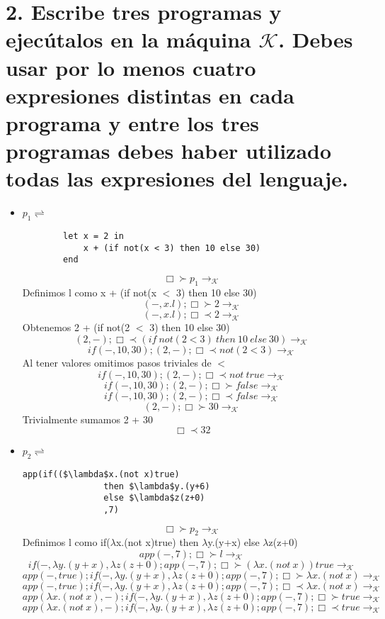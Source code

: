 \documentclass[11pt, a4paper]{report}
\begin{document}
\section*{2. Escribe tres programas y ejecútalos en la máquina $\mathcal{K}$. Debes usar por lo menos cuatro expresiones distintas en cada programa y entre los tres programas debes haber utilizado todas las expresiones del lenguaje.}
	\begin{itemize}
		\item $p_{1} \rightleftharpoons$
		\begin{lstlisting}
		let x = 2 in 
			x + (if not(x < 3) then 10 else 30)
		end
		\end{lstlisting}		
		$$ \Box \succ p_{1} \rightarrow_{\mathcal{K}}$$
		Definimos l como x + (if not(x $<$ 3) then 10 else 30)
		$$ (-,x.l);\Box \succ 2 \rightarrow_{\mathcal{K}} $$
		$$ (-,x.l);\Box \prec 2 \rightarrow_{\mathcal{K}} $$
		Obtenemos 2 + (if not(2 $<$ 3) then 10 else 30)
		$$ (2,-);\Box \prec (if\ not(2 < 3)\ then\ 10\ else\ 30) \rightarrow_{\mathcal{K}}$$
		$$ if(-,10,30);(2,-);\Box \prec not(2<3) \rightarrow_{\mathcal{K}}$$
		Al tener valores omitimos pasos triviales de $<$
		$$ if(-,10,30);(2,-);\Box \prec not\ true \rightarrow_{\mathcal{K}}$$
		$$ if(-,10,30);(2,-);\Box \succ false \rightarrow_{\mathcal{K}}$$
		$$ if(-,10,30);(2,-);\Box \prec false \rightarrow_{\mathcal{K}} $$
		$$ (2,-);\Box \succ 30 \rightarrow_{\mathcal{K}}$$
		Trivialmente sumamos 2 + 30
		$$ \Box \prec 32 $$
		\item $p_{2} \rightleftharpoons$
		\begin{lstlisting}[mathescape=true]
			app(if(($\lambda$x.(not x)true) 
				then $\lambda$y.(y+6) 
				else $\lambda$z(z+0)
				,7)
		\end{lstlisting}
		$$ \Box \succ p_{2} \rightarrow_{\mathcal{K}}$$
		Definimos l como if($\lambda$x.(not x)true) then $\lambda$y.(y+x) else $\lambda$z(z+0)
		$$ app(-,7); \Box \succ l \rightarrow_{\mathcal{K}} $$
		$$ if(-,\lambda y.(y+x),\lambda z(z+0);app(-,7); \Box \succ (\lambda x.(not\ x))true \rightarrow_{\mathcal{K}}  $$
		$$ app(-,true);if(-,\lambda y.(y+x),\lambda z(z+0);app(-,7); \Box \succ \lambda x.(not\ x) \rightarrow_{\mathcal{K}}$$
		$$ app(-,true);if(-,\lambda y.(y+x),\lambda z(z+0);app(-,7); \Box \prec \lambda x.(not\ x) \rightarrow_{\mathcal{K}} $$
		$$ app(\lambda x.(not\ x),-);if(-,\lambda y.(y+x),\lambda z(z+0);app(-,7); \Box \succ true  \rightarrow_{\mathcal{K}} $$
		$$ app(\lambda x.(not\ x),-);if(-,\lambda y.(y+x),\lambda z(z+0);app(-,7); \Box \prec true  \rightarrow_{\mathcal{K}} $$

\end{itemize}
\end{document}
